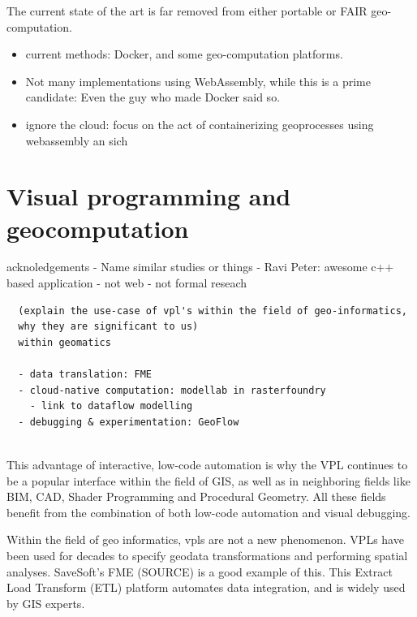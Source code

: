 The current state of the art is far removed from either portable or FAIR geo-computation. 
\begin{itemize}
  \item current methods: Docker, and some geo-computation platforms.
  \item Not many implementations using WebAssembly, while this is a prime candidate: Even the guy who made Docker said so. 
  \item ignore the cloud: focus on the act of containerizing geoprocesses using webassembly an sich
\end{itemize}

\section{Visual programming and geocomputation}
\label{sec:related-geovpl}

acknoledgements
- Name similar studies or things 
  - Ravi Peter: awesome c++ based application 
    - not web
    - not formal reseach

\begin{lstlisting}
  (explain the use-case of vpl's within the field of geo-informatics, 
  why they are significant to us) 
  within geomatics

  - data translation: FME 
  - cloud-native computation: modellab in rasterfoundry
    - link to dataflow modelling
  - debugging & experimentation: GeoFlow 
  
\end{lstlisting}


This advantage of interactive, low-code automation is why the VPL continues to be a popular interface within the field of GIS, as well as in neighboring fields like BIM, CAD, Shader Programming and Procedural Geometry. 
All these fields benefit from the combination of both low-code automation and visual debugging.

Within the field of geo informatics, \ac{vpl}s are not a new phenomenon. VPLs have been used for decades to specify geodata transformations and performing spatial analyses.  
SaveSoft's FME (SOURCE) is a good example of this. This Extract Load Transform (ETL) platform automates data integration, and is widely used by GIS experts.



